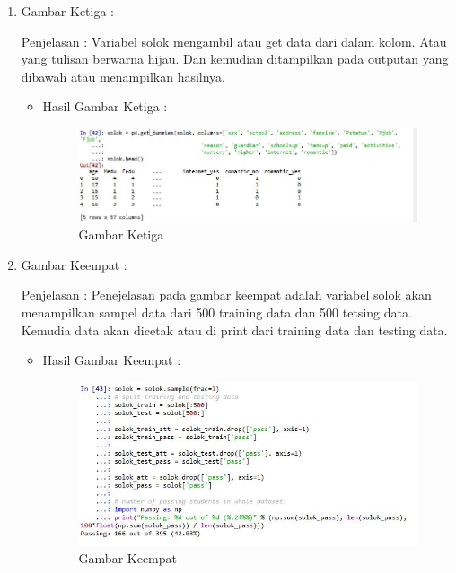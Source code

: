 \begin{itemize}
\begin{enumerate}
\begin{itemize}
\end{itemize}
\par
\item  Gambar Ketiga :
\par Penjelasan : Variabel solok mengambil atau get data dari dalam kolom. Atau yang tulisan berwarna hijau. Dan kemudian ditampilkan pada outputan yang dibawah atau menampilkan hasilnya.
\par 
\begin{itemize}
\par
\item Hasil  Gambar Ketiga :

\begin{figure}[ht]
\centering
\includegraphics[scale=0.5]{figures/3.jpg}
\caption{ Gambar Ketiga}
\label{3}
\end{figure}

\end{itemize}
\par
\item  Gambar Keempat :
\par Penjelasan : Penejelasan pada gambar keempat adalah variabel solok akan menampilkan sampel data dari 500 training data dan 500 tetsing data. Kemudia data akan dicetak atau di print dari training data dan testing data.
\par 
\begin{itemize}
\par
\item Hasil  Gambar Keempat :

\begin{figure}[ht]
\centering
\includegraphics[scale=0.5]{figures/4.jpg}
\caption{ Gambar Keempat}
\label{4}
\end{figure}


\end{itemize}
\end{enumerate}
\end{itemize}

